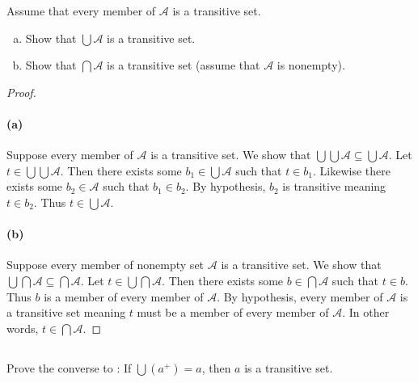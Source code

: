 \documentclass{report}
\begin{document}
  Assume that every member of $\mathscr{A}$ is a transitive set.
  \begin{enumerate}[(a)]
    \item Show that $\bigcup\mathscr{A}$ is a transitive set.
    \item Show that $\bigcap\mathscr{A}$ is a transitive set (assume that
      $\mathscr{A}$ is nonempty).
  \end{enumerate}

  \begin{proof}

    \paragraph{(a)}%

      Suppose every member of $\mathscr{A}$ is a transitive set.
      We show that $\bigcup\bigcup{\mathscr{A}} \subseteq \bigcup{\mathscr{A}}$.
      Let $t \in \bigcup\bigcup{\mathscr{A}}$.
      Then there exists some $b_1 \in \bigcup{\mathscr{A}}$ such that
        $t \in b_1$.
      Likewise there exists some $b_2 \in \mathscr{A}$ such that $b_1 \in b_2$.
      By hypothesis, $b_2$ is transitive meaning $t \in b_2$.
      Thus $t \in \bigcup{\mathscr{A}}$.

    \paragraph{(b)}%

      Suppose every member of nonempty set $\mathscr{A}$ is a transitive set.
      We show that $\bigcup\bigcap{\mathscr{A}} \subseteq \bigcap{\mathscr{A}}$.
      Let $t \in \bigcup\bigcap{\mathscr{A}}$.
      Then there exists some $b \in \bigcap{\mathscr{A}}$ such that $t \in b$.
      Thus $b$ is a member of every member of $\mathscr{A}$.
      By hypothesis, every member of $\mathscr{A}$ is a transitive set meaning
        $t$ must be a member of every member of $\mathscr{A}$.
      In other words, $t \in \bigcap{\mathscr{A}}$.

  \end{proof}

\subsection{}%

  Prove the converse to : If
    $\bigcup \left(a^+\right) = a$, then $a$ is a transitive set.
\end{document}
